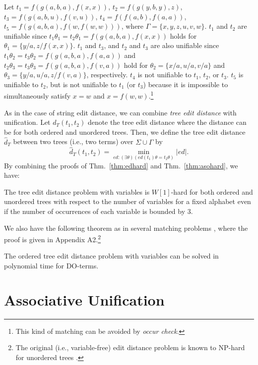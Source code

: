 \documentclass[a4paper]{llncs}
\begin{document}
\begin{example}
Let $t_1 = f(g(a,b,a),f(x,x))$,
$t_2 = f(g(y,b,y),z)$,
$t_3 = f(g(a,b,u),f(v,u))$,
$t_4 = f(f(a,b),f(a,a))$,
$t_5 = f(g(a,b,a),f(w,f(w,w)))$,
where $\Gamma=\{x,y,z,u,v,w\}$.
$t_1$ and $t_2$ are unifiable since 
$t_1 \theta_1 = t_2 \theta_1 = f(g(a,b,a),f(x,x))$ holds for
$\theta_1 = \{y/a,z/f(x,x)\}$.
$t_1$ and $t_3$, and $t_2$ and $t_3$ are also unifiable since 
$t_1 \theta_2 = t_3 \theta_2 = f(g(a,b,a),f(a,a))$ and
$t_2 \theta_3 = t_3 \theta_3 = f(g(a,b,a),f(v,a))$ hold for
$\theta_2=\{x/a,u/a,v/a\}$ and
$\theta_3=\{y/a,u/a,z/f(v,a)\}$, respectively.
$t_4$ is not unifiable to $t_1$, $t_2$, or $t_3$.
$t_5$ is unifiable to $t_2$, but is not unifiable to
$t_1$ (or $t_3$) because it is impossible to simultaneously satisfy
$x=w$ and $x=f(w,w)$.\footnote{This kind of matching can be avoided by
\emph{occur check}.}
\end{example}

As in the case of string edit distance,
we can combine \emph{tree edit distance} \cite{bille05}
with unification.
Let $d_T(t_1,t_2)$ denote the tree edit distance where
the distance can be for both ordered and unordered trees.
Then, we define the tree edit distance $\hat{d}_T$
between two trees (i.e., two terms) over $\Sigma \cup \Gamma$
by
\[
\hat{d}_T(t_1,t_2) = \min_{ed:(\exists \theta)(ed(t_1)\theta = t_2 \theta)} |ed|.
\]
By combining the proofs of Thm.~\ref{thm:edhard} and
Thm.~\ref{thm:asohard}, we have:

\begin{theorem}
The tree edit distance problem
with variables is $W[1]$-hard for both ordered and unordered trees
with respect to
the number of variables for a fixed alphabet even if
the number of occurrences of each variable is bounded by 3.
\label{thm:tree-ed-hard}
\end{theorem}

We also have the following theorem as in several matching problems
\cite{benanav87},
where the proof is given in Appendix A2.\footnote{
The original (i.e., variable-free) edit distance problem is known to NP-hard
for unordered trees \cite{bille05}.}

\begin{theorem}
The ordered tree edit distance problem with variables
can be solved in polynomial time for DO-terms.
\label{thm:tree-ed-do}
\end{theorem}

\section{Associative Unification}
\end{document}
